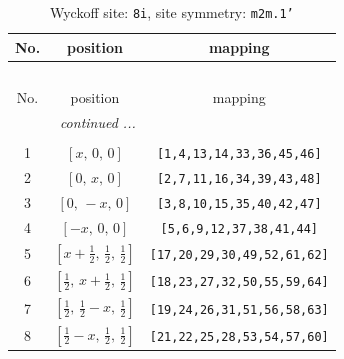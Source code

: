 \documentclass[fleqn,8pt]{jsarticle}
\begin{document}
\begin{longtable}{ccc}
\caption{Wyckoff site: {\tt 8i}, site symmetry: {\tt m2m.1'}}
 \\
 \hline \hline
No. & position & mapping \\ \hline \endfirsthead

\multicolumn{2}{l}{\tablename\ \thetable{}} \\
 \hline \hline
No. & position & mapping \\ \hline \endhead

 \hline \hline
\multicolumn{2}{r}{\footnotesize\it continued ...} \\ \endfoot

 \hline \hline
\multicolumn{2}{r}{} \\ \endlastfoot

1 & $\left[ x,\, 0,\, 0 \right]$ & {\tt [1,4,13,14,33,36,45,46]} \\ \hline
2 & $\left[ 0,\, x,\, 0 \right]$ & {\tt [2,7,11,16,34,39,43,48]} \\ \hline
3 & $\left[ 0,\, - x,\, 0 \right]$ & {\tt [3,8,10,15,35,40,42,47]} \\ \hline
4 & $\left[ - x,\, 0,\, 0 \right]$ & {\tt [5,6,9,12,37,38,41,44]} \\ \hline
5 & $\left[ x + \frac{1}{2},\, \frac{1}{2},\, \frac{1}{2} \right]$ & {\tt [17,20,29,30,49,52,61,62]} \\ \hline
6 & $\left[ \frac{1}{2},\, x + \frac{1}{2},\, \frac{1}{2} \right]$ & {\tt [18,23,27,32,50,55,59,64]} \\ \hline
7 & $\left[ \frac{1}{2},\, \frac{1}{2} - x,\, \frac{1}{2} \right]$ & {\tt [19,24,26,31,51,56,58,63]} \\ \hline
8 & $\left[ \frac{1}{2} - x,\, \frac{1}{2},\, \frac{1}{2} \right]$ & {\tt [21,22,25,28,53,54,57,60]} \\
\end{longtable}
\renewcommand{\arraystretch}{1.2}
\end{document}
